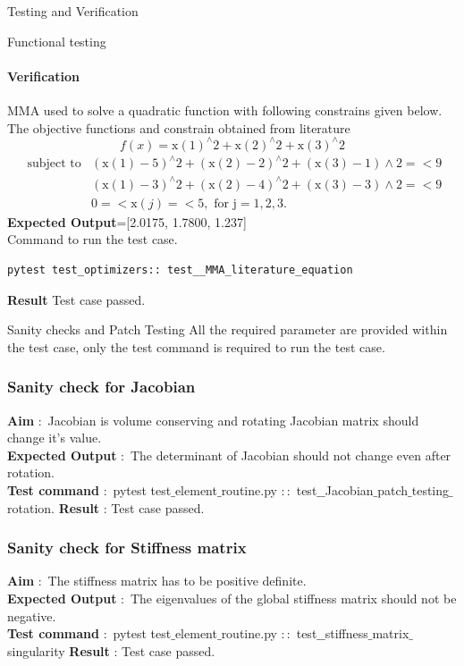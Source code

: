 \documentclass[a4paper,12pt,times]{article}
\begin{document}
\begin{section}{Testing and Verification}
\begin{subsection}{Functional testing}
\paragraph{Verification}
MMA used to solve a quadratic function with following constrains given below. The objective functions and constrain obtained from literature \cite{https://doi.org/10.1002/nme.1620240207} 
\begin{equation}
f(x)=\mathrm{x}(1)^{\wedge} 2+\mathrm{x}(2)^{\wedge} 2+\mathrm{x}(3)^{\wedge} 2
\end{equation}
\begin{equation}
\begin{aligned}
\text { subject } \mathrm{to  } &(\mathrm{x}(1)-5)^{\wedge} 2+(\mathrm{x}(2)-2)^{\wedge} 2+(\mathrm{x}(3)-1) \wedge 2=<9 \\
&(\mathrm{x}(1)-3)^{\wedge} 2+(\mathrm{x}(2)-4)^{\wedge} 2+(\mathrm{x}(3)-3) \wedge 2=<9 \\
& 0=<\mathrm{x}(j)=<5, \text { for } \mathrm{j}=1,2,3 .
\end{aligned}
\end{equation}
\textbf{Expected Output}=[2.0175, 1.7800, 1.237]\\
Command to run the test case.
\begin{lstlisting}
pytest test_optimizers:: test__MMA_literature_equation
\end{lstlisting}
\textbf{Result} Test case passed.
\end{subsection}


\begin{subsection}{Sanity checks and Patch Testing}
All the required parameter are provided within the test case, only the test command is required to run the test case.
\subsubsection{Sanity check for Jacobian }
\textbf{Aim} $\colon$ Jacobian is volume conserving and rotating Jacobian matrix should change it's value.\citep{patchtest} \\ 
\textbf{Expected Output} $\colon$ The determinant of Jacobian should not change even after rotation.\\
\textbf{Test command} $\colon$ pytest test$\_$element$\_$routine.py $\colon \colon $ test$\_ \_$Jacobian$\_$patch$\_$testing$\_$rotation.
\textbf{Result} : Test case passed.

\subsubsection{Sanity check for Stiffness matrix }
\textbf{Aim} $\colon$ The stiffness matrix has to be positive definite.\citep{patchtest} \\ 
\textbf{Expected Output} $\colon$ The eigenvalues of the global stiffness matrix should not be negative.\\
\textbf{Test command} $\colon$ pytest test$\_$element$\_$routine.py $\colon \colon $ test$\_ \_ $stiffness$\_$matrix$\_$singularity
\textbf{Result} : Test case passed. 


\end{subsection}
\end{section}
\end{document}
